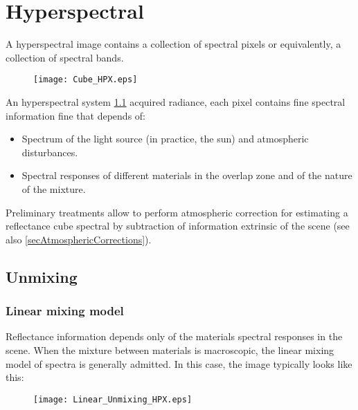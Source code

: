 \chapter{Hyperspectral}

A hyperspectral image contains a collection of spectral pixels or
equivalently, a collection of spectral bands.

\begin{figure}[h]
  \centering
  \texttt{[image: Cube\_HPX.eps]}
  \label{fig:cube}
\end{figure}

An hyperspectral system \ref{fig:cube} acquired
radiance, each pixel contains fine spectral information
fine that depends of:

\begin{itemize}
\item{Spectrum of the light source (in practice, the
sun) and atmospheric disturbances.}
\item{Spectral responses
of different materials in the overlap zone and of the nature of the mixture.}
\end{itemize}

Preliminary treatments allow to perform 
atmospheric correction for estimating a reflectance cube
spectral by subtraction of information extrinsic of the
scene (see also \ref{secAtmosphericCorrections}).
 
\section{Unmixing}

\subsection{Linear mixing model}

Reflectance information depends only of the materials spectral responses in the scene. When the mixture between
materials is macroscopic, the linear mixing model of spectra
is generally admitted. In this case, the image typically looks like this:

\begin{figure}[h]
  \centering
  \texttt{[image: Linear\_Unmixing\_HPX.eps]}
  \label{fig:linear_unmixing}
\end{figure}

